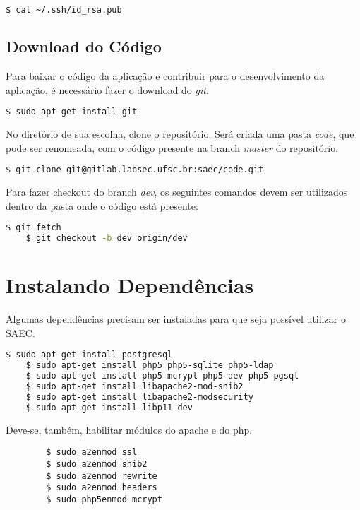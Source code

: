 \begin{lstlisting}[language=bash]
    $ cat ~/.ssh/id_rsa.pub
\end{lstlisting}

\subsection{Download do Código}
Para baixar o código da aplicação e contribuir para o desenvolvimento da aplicação, é necessário fazer o download do \textit{git}.

\begin{lstlisting}[language=bash]
	$ sudo apt-get install git
\end{lstlisting}

No diretório de sua escolha, clone o repositório. Será criada uma pasta \textit{code}, que pode ser renomeada, com o código presente na branch \textit{master} do repositório.

\begin{lstlisting}[language=bash]
	$ git clone git@gitlab.labsec.ufsc.br:saec/code.git
\end{lstlisting}

Para fazer checkout do branch \textit{dev}, os seguintes comandos devem ser utilizados dentro da pasta onde o código está presente:

\begin{lstlisting}[language=bash]
	$ git fetch
	$ git checkout -b dev origin/dev
\end{lstlisting}


\section{Instalando Dependências}
Algumas dependências precisam ser instaladas para que seja possível utilizar o SAEC.

\begin{lstlisting}[language=bash]
	$ sudo apt-get install postgresql
	$ sudo apt-get install php5 php5-sqlite php5-ldap
	$ sudo apt-get install php5-mcrypt php5-dev php5-pgsql
	$ sudo apt-get install libapache2-mod-shib2
	$ sudo apt-get install libapache2-modsecurity
	$ sudo apt-get install libp11-dev
\end{lstlisting}

Deve-se, também, habilitar módulos do apache e do php.

\begin{lstlisting}
        $ sudo a2enmod ssl
        $ sudo a2enmod shib2
        $ sudo a2enmod rewrite
        $ sudo a2enmod headers
        $ sudo php5enmod mcrypt
\end{lstlisting}

